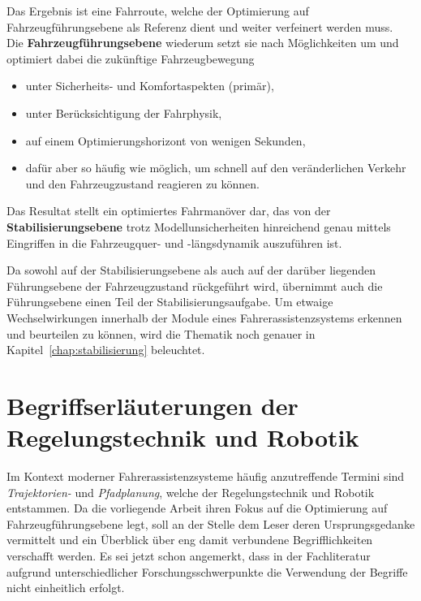 Das Ergebnis ist eine Fahrroute, welche der Optimierung auf Fahrzeugführungsebene als Referenz dient und weiter verfeinert werden muss. \\
Die \textbf{Fahrzeugführungsebene} wiederum setzt sie nach Möglichkeiten um und optimiert dabei die zukünftige Fahrzeugbewegung
\begin{itemize}
\item unter Sicherheits- und Komfortaspekten (primär),
\item unter Berücksichtigung der Fahrphysik,
\item auf einem Optimierungshorizont von wenigen Sekunden, 
\item dafür aber so häufig wie möglich, um schnell auf den veränderlichen Verkehr und den Fahrzeugzustand reagieren zu können.
\end{itemize}
Das Resultat stellt ein optimiertes Fahrmanöver dar, das von der \textbf{Stabilisierungsebene} trotz Modellunsicherheiten hinreichend genau mittels Eingriffen in die Fahrzeugquer- und -längsdynamik auszuführen ist.

Da sowohl auf der Stabilisierungsebene als auch auf der darüber liegenden Führungsebene der Fahrzeugzustand rückgeführt wird, übernimmt auch die Führungsebene einen Teil der Stabilisierungsaufgabe. 
Um etwaige Wechselwirkungen innerhalb der Module eines Fahrerassistenzsystems erkennen und beurteilen zu können, wird die Thematik noch genauer in Kapitel~\ref{chap:stabilisierung} beleuchtet. %

\section{Begriffserläuterungen der Regelungstechnik und Robotik} \label{sec:begriffe}
Im Kontext moderner Fahrerassistenzsysteme häufig anzutreffende Termini sind \emph{Trajektorien-} und \emph{Pfadplanung},  welche der Regelungstechnik und Robotik entstammen. Da die vorliegende Arbeit ihren Fokus auf die Optimierung auf Fahrzeugführungsebene legt, soll an der Stelle dem Leser deren Ursprungsgedanke vermittelt und ein Überblick über eng damit verbundene Begrifflichkeiten verschafft werden. Es sei jetzt schon angemerkt, dass in der Fachliteratur aufgrund unterschiedlicher Forschungsschwerpunkte die Verwendung der Begriffe nicht einheitlich erfolgt.
